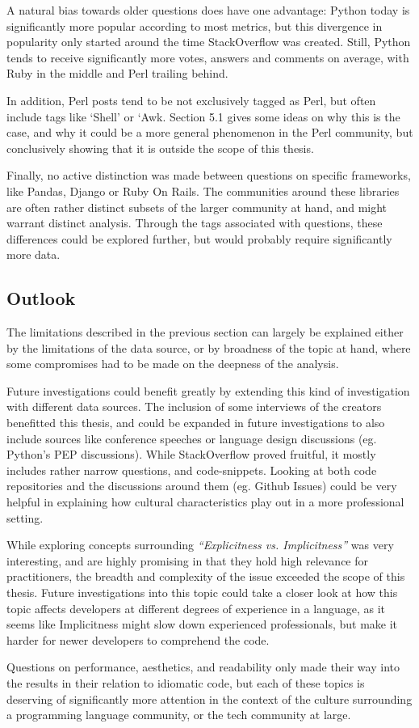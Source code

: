 A natural bias towards older questions does have one advantage: Python today is significantly more popular according
to most metrics, but this divergence in popularity only started around the time StackOverflow was created. Still,
Python tends to receive significantly more votes, answers and comments on average, with Ruby in the middle and Perl
trailing behind.

In addition, Perl posts tend to be not exclusively tagged as Perl, but often include tags like ‘Shell’ or ‘Awk. Section
5.1 gives some ideas on why this is the case, and why it could be a  more general phenomenon in the Perl community, but
conclusively showing that it is outside the scope of this thesis.

Finally, no active distinction was made between questions on specific frameworks, like Pandas, Django or Ruby On Rails.
The communities around these libraries are often rather distinct subsets of the larger community at hand, and might
warrant distinct analysis. Through the tags associated with questions, these differences could be explored further,
but would probably require significantly more data.

\subsection{Outlook}

The limitations described in the previous section can largely be explained either by the limitations of the data source,
or by broadness of the topic at hand, where some compromises had to be made on the deepness of the analysis.

Future investigations could benefit greatly by extending this kind of investigation with different data sources.
The inclusion of some interviews of the creators benefitted this thesis, and could be expanded in future investigations
to also include sources like conference speeches or language design discussions (eg. Python’s PEP discussions).
While StackOverflow proved fruitful, it mostly includes rather narrow questions, and code-snippets. Looking at both code
repositories and the discussions around them (eg. Github Issues) could be very helpful in explaining how cultural
characteristics play out in a more professional setting.

While exploring concepts surrounding \textit{“Explicitness vs. Implicitness”} was very interesting, and are highly promising
in that they hold high relevance for practitioners, the breadth and complexity of the issue exceeded the scope of this thesis.
Future investigations into this topic could take a closer look at how this topic affects developers at different degrees
of experience in a language, as it seems like Implicitness might slow down experienced professionals, but make it harder
for newer developers to comprehend the code.

Questions on performance, aesthetics, and readability only made their way into the results in their relation to
idiomatic code, but each of these topics is deserving of significantly more attention in the context of the culture
surrounding a programming language community, or the tech community at large.
